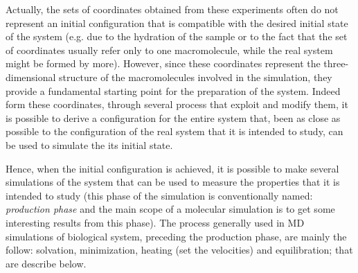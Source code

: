 
Actually, the sets of coordinates obtained from these experiments often do not represent an initial configuration that is compatible with the desired initial state of the system (e.g. due to the hydration of the sample or to the fact that the set of coordinates usually refer only to one macromolecule, while the real system might be formed by more).
However, since these coordinates represent the three-dimensional structure of the macromolecules involved in the simulation, they provide a fundamental starting point for the preparation of the system. 
Indeed form these coordinates, through several process that exploit and modify them, it is possible to derive a configuration for the entire system that, been as close as possible to the configuration of the real system that it is intended to study, can be used to simulate the its initial state.

Hence, when the initial configuration is achieved, it is possible to make several simulations of the system that can be used to measure the properties that it is intended to study (this phase of the simulation is conventionally named: \textit{production phase} and the main scope of a molecular simulation is to get some interesting results from this phase). The process generally used in MD simulations of biological system, preceding the production phase, are mainly the follow: solvation, minimization, heating (set the velocities) and equilibration; that are describe below.

